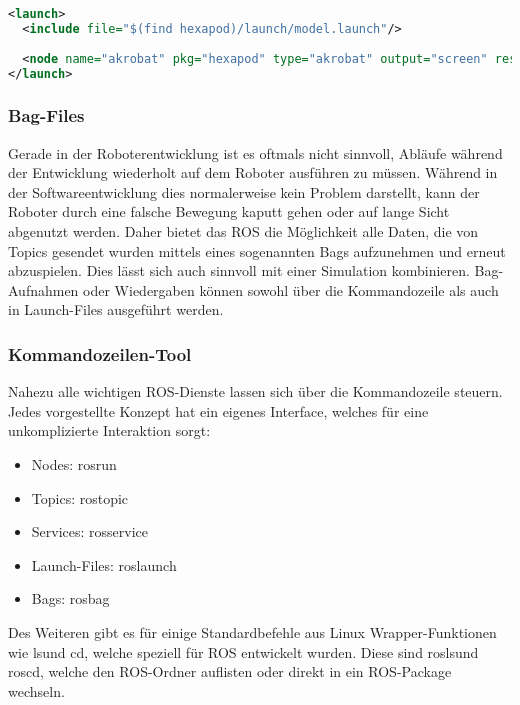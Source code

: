\begin{lstlisting}[label={exampleLaunchFile}, language=Xml, caption={Beispiel eines Launch-Files}]
<launch>
  <include file="$(find hexapod)/launch/model.launch"/>
  
  <node name="akrobat" pkg="hexapod" type="akrobat" output="screen" respawn="false" required="true"></node>
</launch>
\end{lstlisting}
  
\subsubsection{Bag-Files}

Gerade in der Roboterentwicklung ist es oftmals nicht sinnvoll, Abläufe während der Entwicklung wiederholt auf dem Roboter ausführen zu müssen. Während in der Softwareentwicklung dies normalerweise kein Problem darstellt, kann der Roboter durch eine falsche Bewegung kaputt gehen oder auf lange Sicht abgenutzt werden. Daher bietet das \ac{ROS} die Möglichkeit alle Daten, die von Topics gesendet wurden mittels eines sogenannten Bags aufzunehmen und erneut abzuspielen. Dies lässt sich auch sinnvoll mit einer Simulation kombinieren. Bag-Aufnahmen oder Wiedergaben können sowohl über die Kommandozeile als auch in Launch-Files ausgeführt werden.

\subsubsection{Kommandozeilen-Tool}

Nahezu alle wichtigen \ac{ROS}-Dienste lassen sich über die Kommandozeile steuern. Jedes vorgestellte Konzept hat ein eigenes Interface, welches für eine unkomplizierte Interaktion sorgt:
\begin{itemize}
\item Nodes: rosrun
\item Topics: rostopic
\item Services: rosservice
\item Launch-Files: roslaunch
\item Bags: rosbag
\end{itemize}

Des Weiteren gibt es für einige Standardbefehle aus Linux Wrapper-Funktionen wie \glq ls\grq und \glq cd\grq, welche speziell für \ac{ROS} entwickelt wurden. Diese sind \glq rosls\grq und \glq roscd\grq, welche den \ac{ROS}-Ordner auflisten oder direkt in ein \ac{ROS}-Package wechseln.

